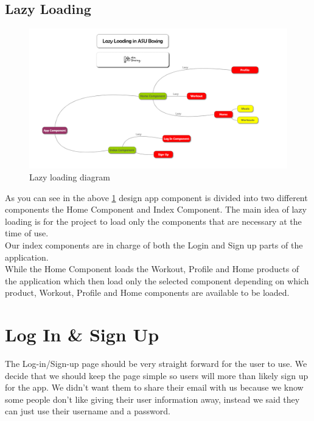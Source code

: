 \documentclass[a4paper,12pt]{report}
\begin{document}
\subsection{Lazy Loading}
\begin{figure}[h]
\includegraphics[scale=.5]{images/Lazy-Loading(4).PNG}
\caption{Lazy loading diagram}
\label{fig:LazyLoading}
\end{figure}
\newpage
As you can see in the above \ref{fig:LazyLoading} design app component is divided into two different components the Home Component and Index Component.
The main idea of lazy loading is for the project to load only the components that are necessary at the time of use. \\
Our index components are in charge of both the Login and Sign up parts of the application.\\
While the Home Component loads the Workout, Profile and Home products of the application which then load only the selected component depending on which product, Workout, Profile and Home components are available to be loaded. 

\section{Log In \& Sign Up}
The Log-in/Sign-up page should be very straight forward for the user to use. We decide that we should keep the page simple so users will more than likely sign up for the app. We didn't want them to share their email with us because we know some people don't like giving their user information away, instead we said they can just use their username and a password.
\end{document}
